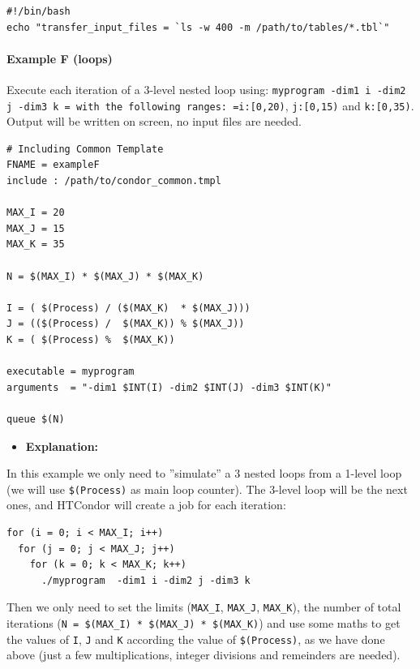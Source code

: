 \documentclass[a4paper,10pt]{article}
\begin{document}
\begin{verbatim}
#!/bin/bash
echo "transfer_input_files = `ls -w 400 -m /path/to/tables/*.tbl`"
\end{verbatim}

\paragraph{Example F (loops)}
\label{sec:orga3a6a0b}

Execute each iteration of a 3-level nested loop using: \texttt{myprogram -dim1 i -dim2
j -dim3 k = with the following ranges: =i:[0,20)}, \texttt{j:[0,15)} and
\texttt{k:[0,35)}. Output will be written on screen, no input files are needed.

\begin{verbatim}
# Including Common Template
FNAME = exampleF
include : /path/to/condor_common.tmpl
 
MAX_I = 20
MAX_J = 15
MAX_K = 35

N = $(MAX_I) * $(MAX_J) * $(MAX_K)

I = ( $(Process) / ($(MAX_K)  * $(MAX_J)))
J = (($(Process) /  $(MAX_K)) % $(MAX_J))
K = ( $(Process) %  $(MAX_K))

executable = myprogram
arguments  = "-dim1 $INT(I) -dim2 $INT(J) -dim3 $INT(K)"

queue $(N) 
\end{verbatim}

\begin{itemize}
\item \textbf{Explanation:}
\end{itemize}

In this example we only need to ''simulate'' a 3 nested loops from a 1-level
loop (we will use \texttt{\$(Process)} as main loop counter). The 3-level loop will be
the next ones, and HTCondor will create a job for each iteration:

\begin{verbatim}
for (i = 0; i < MAX_I; i++)
  for (j = 0; j < MAX_J; j++)
    for (k = 0; k < MAX_K; k++)
      ./myprogram  -dim1 i -dim2 j -dim3 k
\end{verbatim}

Then we only need to set the limits (\texttt{MAX\_I}, \texttt{MAX\_J}, \texttt{MAX\_K}), the number of
total iterations (\texttt{N = \$(MAX\_I) * \$(MAX\_J) * \$(MAX\_K)}) and use some maths to
get the values of \texttt{I}, \texttt{J} and \texttt{K} according the value of \texttt{\$(Process)}, as we
have done above (just a few multiplications, integer divisions and remeinders
are needed). 
\end{document}
